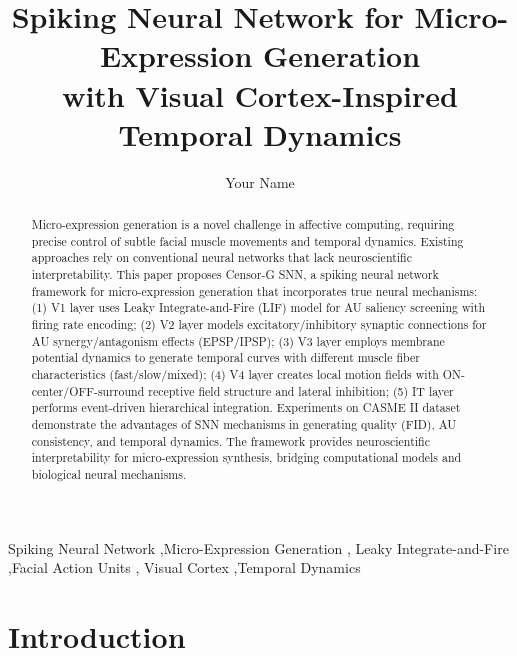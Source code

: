 \documentclass[preprint,12pt]{elsarticle}
\begin{document}
\begin{frontmatter}

\title{Spiking Neural Network for Micro-Expression Generation \\
with Visual Cortex-Inspired Temporal Dynamics}

\author[inst1]{Your Name}

\begin{abstract}
Micro-expression generation is a novel challenge in affective computing,
requiring precise control of subtle facial muscle movements and temporal dynamics.
Existing approaches rely on conventional neural networks that lack neuroscientific
interpretability. This paper proposes Censor-G SNN, a spiking neural network
framework for micro-expression generation that incorporates true neural mechanisms:
(1) V1 layer uses Leaky Integrate-and-Fire (LIF) model for AU saliency screening
with firing rate encoding; (2) V2 layer models excitatory/inhibitory synaptic
connections for AU synergy/antagonism effects (EPSP/IPSP); (3) V3 layer employs
membrane potential dynamics to generate temporal curves with different muscle
fiber characteristics (fast/slow/mixed); (4) V4 layer creates local motion fields
with ON-center/OFF-surround receptive field structure and lateral inhibition;
(5) IT layer performs event-driven hierarchical integration. Experiments on CASME II
dataset demonstrate the advantages of SNN mechanisms in generating quality (FID),
AU consistency, and temporal dynamics. The framework provides neuroscientific
interpretability for micro-expression synthesis, bridging computational models
and biological neural mechanisms.
\end{abstract}

\begin{keyword}
Spiking Neural Network \sep Micro-Expression Generation \sep
Leaky Integrate-and-Fire \sep Facial Action Units \sep
Visual Cortex \sep Temporal Dynamics
\end{keyword}

\end{frontmatter}

\section{Introduction}
\label{sec:introduction}
\end{document}
